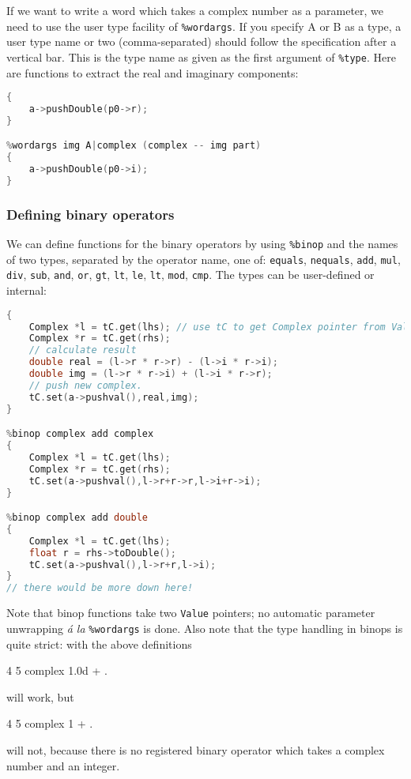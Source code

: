 If we want to write a word which takes a complex number as a parameter,
we need to use the user type facility of \texttt{\%wordargs}. If you
specify A or B as a type, a user type name or two (comma-separated) should
follow the specification after a vertical bar. This is the type
name as given as the first argument of \texttt{\%type}. Here are
functions to extract the real and imaginary components:
\begin{lstlisting}[language=c++]
%wordargs real A|complex (complex -- real part)
{
    a->pushDouble(p0->r);
}

%wordargs img A|complex (complex -- img part)
{
    a->pushDouble(p0->i);
}
\end{lstlisting}

\clearpage
\subsubsection{Defining binary operators}
We can define functions for the binary operators by using
\texttt{\%binop} and the names of two types, separated by the operator
name, one of: \texttt{equals}, \texttt{nequals}, \texttt{add}, \texttt{mul},
\texttt{div}, \texttt{sub}, \texttt{and}, \texttt{or}, \texttt{gt}, 
\texttt{lt}, \texttt{le}, \texttt{lt}, \texttt{mod}, \texttt{cmp}. 
The types can be user-defined or internal:
\begin{lstlisting}[language=c++]
%binop complex mul complex
{
    Complex *l = tC.get(lhs); // use tC to get Complex pointer from Value
    Complex *r = tC.get(rhs);
    // calculate result
    double real = (l->r * r->r) - (l->i * r->i);
    double img = (l->r * r->i) + (l->i * r->r);
    // push new complex.
    tC.set(a->pushval(),real,img);
}

%binop complex add complex
{
    Complex *l = tC.get(lhs);
    Complex *r = tC.get(rhs);
    tC.set(a->pushval(),l->r+r->r,l->i+r->i);
}

%binop complex add double
{
    Complex *l = tC.get(lhs);
    float r = rhs->toDouble();
    tC.set(a->pushval(),l->r+r,l->i);
}
// there would be more down here!
\end{lstlisting}
Note that binop functions take two \texttt{Value} pointers; no
automatic parameter unwrapping \emph{\'a la} \texttt{\%wordargs} is
done. Also note that the type handling in binops is quite strict:
with the above definitions
\begin{v}
4 5 complex 1.0d + .
\end{v}
will work, but
\begin{v}
4 5 complex 1 + .
\end{v}
will not, because there is no registered binary operator which
takes a complex number and an integer.

